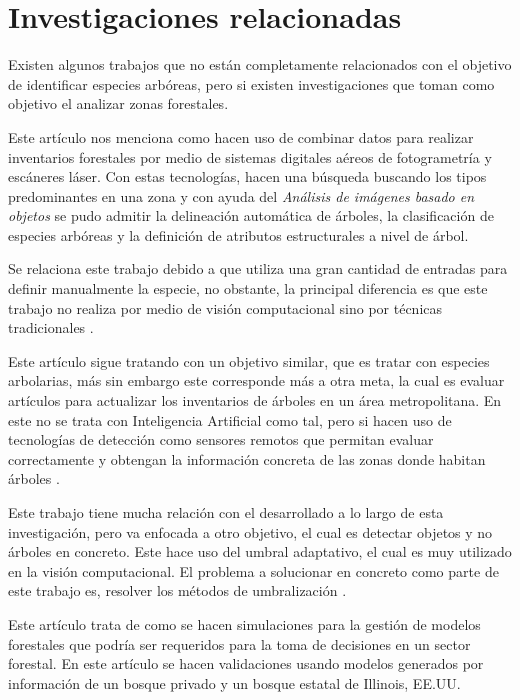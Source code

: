 \section{Investigaciones relacionadas}
Existen algunos trabajos que no están completamente relacionados con el objetivo de identificar especies arbóreas, pero si existen investigaciones que toman como objetivo el analizar zonas forestales.

Este artículo nos menciona como hacen uso de combinar datos para realizar inventarios forestales por medio de sistemas digitales aéreos de fotogrametría y escáneres láser. Con estas tecnologías, hacen una búsqueda buscando los tipos predominantes en una zona y con ayuda del \emph{Análisis de imágenes basado en objetos} se pudo admitir la delineación automática de árboles, la clasificación de especies arbóreas y la definición de atributos estructurales a nivel de árbol. 
\newline
\break

Se relaciona este trabajo debido a que utiliza una gran cantidad de entradas para definir manualmente la especie, no obstante, la principal diferencia es que este trabajo no realiza por medio de visión computacional sino por técnicas tradicionales \cite{rf1}.
 
Este artículo sigue tratando con un objetivo similar, que es tratar con especies arbolarias, más sin embargo este corresponde más a otra meta, la cual es evaluar artículos para actualizar los inventarios de árboles en un área metropolitana. En este no se trata con Inteligencia Artificial como tal, pero si hacen uso de tecnologías de detección como sensores remotos que permitan evaluar correctamente y obtengan la información concreta de las zonas donde habitan  árboles \cite{rf2}.

Este trabajo tiene mucha relación con el desarrollado a lo largo de esta investigación, pero va enfocada a otro objetivo, el cual es detectar objetos y no árboles en concreto. Este hace uso del umbral adaptativo, el cual es muy utilizado en la visión computacional. El problema a solucionar en concreto como parte de este trabajo es, resolver los métodos de umbralización \cite{rf3}.

Este artículo trata de como se hacen simulaciones para la gestión de modelos forestales que podría ser requeridos para la toma de decisiones en un sector forestal. En este artículo se hacen validaciones usando modelos generados por información de un bosque privado y un bosque estatal de Illinois, EE.UU.\cite{rf9}

